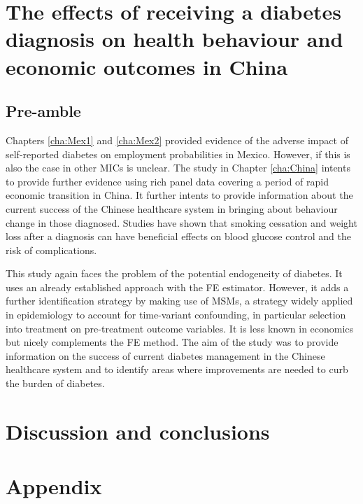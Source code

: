
\acresetall  %
\chapter{\label{cha:China}The effects of receiving a diabetes diagnosis on health behaviour and economic outcomes in China}
\section*{Pre-amble}

Chapters \ref{cha:Mex1} and \ref{cha:Mex2} provided evidence of the adverse impact of self-reported diabetes on employment probabilities in Mexico. However, if this is also the case in other \acp{MIC} is unclear. The study in Chapter \ref{cha:China} intents to provide further evidence using rich panel data covering a period of rapid economic transition in China. It further intents to provide information about the current success of the Chinese healthcare system in bringing about behaviour change in those diagnosed. Studies have shown that smoking cessation and weight loss after a diagnosis can have beneficial effects on blood glucose control and the risk of complications.

This study again faces the problem of the potential endogeneity of diabetes. It uses an already established approach with the \ac{FE} estimator. However, it adds a further identification strategy by making use of \acp{MSM}, a strategy widely applied in epidemiology to account for time-variant confounding, in particular selection into treatment on pre-treatment outcome variables. It is less known in economics but nicely complements the \ac{FE} method. The aim of the study was to provide information on the success of current diabetes management in the Chinese healthcare system and to identify areas where improvements are needed to curb the burden of diabetes.

\acresetall  %
\chapter{\label{cha:Discussion}Discussion and conclusions} 
\acresetall  %

\chapter*{\label{cha:Appendix}Appendix}

\printbibliography

          

